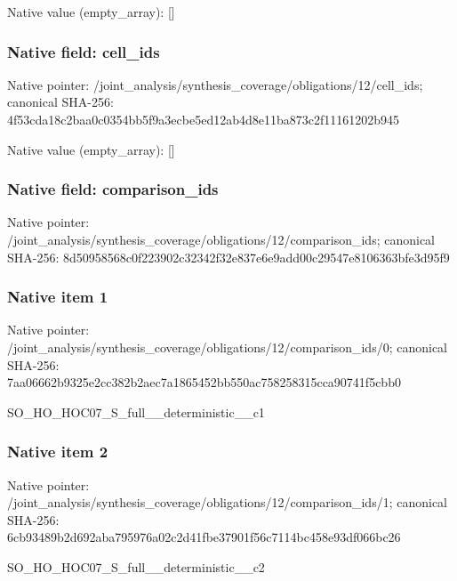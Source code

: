 \documentclass[10pt,a4paper]{article}
\begin{document}
Native value (empty\_\allowbreak{}array): []

\subsubsection{Native field: cell\_\allowbreak{}ids}
Native pointer: /joint\_\allowbreak{}analysis/synthesis\_\allowbreak{}coverage/obligations/12/cell\_\allowbreak{}ids; canonical SHA-256: 4f53cda18c2baa0c0354bb5f9a3ecbe5ed12ab4d8e11ba873c2f11161202b945

Native value (empty\_\allowbreak{}array): []

\subsubsection{Native field: comparison\_\allowbreak{}ids}
Native pointer: /joint\_\allowbreak{}analysis/synthesis\_\allowbreak{}coverage/obligations/12/comparison\_\allowbreak{}ids; canonical SHA-256: 8d50958568c0f223902c32342f32e837e6e9add00c29547e8106363bfe3d95f9

\subsubsection{Native item 1}
Native pointer: /joint\_\allowbreak{}analysis/synthesis\_\allowbreak{}coverage/obligations/12/comparison\_\allowbreak{}ids/0; canonical SHA-256: 7aa06662b9325e2cc382b2aec7a1865452bb550ac758258315cca90741f5cbb0

\begingroup\raggedright\sloppy SO\_\allowbreak{}HO\_\allowbreak{}HOC07\_\allowbreak{}S\_\allowbreak{}full\_\allowbreak{}\_\allowbreak{}deterministic\_\allowbreak{}\_\allowbreak{}c1\par\endgroup

\subsubsection{Native item 2}
Native pointer: /joint\_\allowbreak{}analysis/synthesis\_\allowbreak{}coverage/obligations/12/comparison\_\allowbreak{}ids/1; canonical SHA-256: 6cb93489b2d692aba795976a02c2d41fbe37901f56c7114bc458e93df066bc26

\begingroup\raggedright\sloppy SO\_\allowbreak{}HO\_\allowbreak{}HOC07\_\allowbreak{}S\_\allowbreak{}full\_\allowbreak{}\_\allowbreak{}deterministic\_\allowbreak{}\_\allowbreak{}c2\par\endgroup
\end{document}
